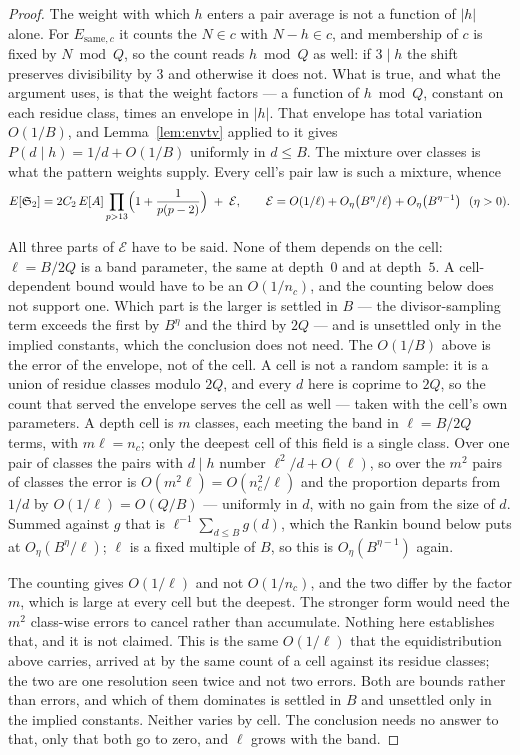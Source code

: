 \documentclass[11pt,a4paper]{article}
\theoremstyle{plain}
\theoremstyle{definition}
\theoremstyle{remark}
\renewcommand{\SS}{\mathfrak{S}}
\begin{document}
\begin{proof}
The weight with which $h$ enters a pair average is not a function of
$|h|$ alone. For $E_{\mathrm{same},c}$ it counts the $N\in c$ with
$N-h\in c$, and membership of $c$ is fixed by $N\bmod Q$, so the count
reads $h\bmod Q$ as well: if $3\mid h$ the shift preserves divisibility
by $3$ and otherwise it does not. What is true, and what the argument
uses, is that the weight factors --- a function of $h\bmod Q$, constant
on each residue class, times an envelope in $|h|$. That envelope has
total variation $O(1/B)$, and Lemma~\ref{lem:envtv} applied to it gives
$P(d\mid h)=1/d+O(1/B)$ uniformly in $d\le B$. The mixture over
classes is what the pattern weights supply. Every cell's pair law is such a
mixture, whence
\[
  E[\SS_2]=2C_2\,E[A]\prod_{p>13}\Bigl(1+\frac1{p(p-2)}\Bigr)
  \;+\;\mathcal E,
  \qquad
  \mathcal E=O(1/\ell)+O_\eta\bigl(B^{\eta}/\ell\bigr)
    +O_\eta\bigl(B^{\eta-1}\bigr)\ \ (\eta>0).
\]

All three parts of $\mathcal E$ have to be said. None of them depends
on the cell: $\ell=B/2Q$ is a band parameter, the same at depth~$0$ and
at depth~$5$. A cell-dependent bound would have to be an $O(1/n_c)$,
and the counting below does not support one.
Which part is the larger is settled in $B$ --- the divisor-sampling
term exceeds the first by $B^{\eta}$ and the third by $2Q$ --- and is
unsettled only in the implied constants, which the conclusion does not
need. The $O(1/B)$ above is the error of the
envelope, not of the cell. A cell is not a random sample: it is a
union of residue classes modulo $2Q$, and every $d$ here is coprime to
$2Q$, so the count that served the envelope serves the cell as well ---
taken with the cell's own parameters. A depth cell is $m$ classes, each
meeting the band in $\ell=B/2Q$ terms, with $m\ell=n_c$; only the
deepest cell of this field is a single class. Over one pair of classes
the pairs with $d\mid h$ number $\ell^2/d+O(\ell)$, so over the $m^2$
pairs of classes the error is $O(m^2\ell)=O(n_c^2/\ell)$ and the
proportion departs from $1/d$ by $O(1/\ell)=O(Q/B)$ --- uniformly in
$d$, with no gain from the size of $d$. Summed against $g$ that is
$\ell^{-1}\sum_{d\le B}g(d)$, which the Rankin bound below puts at
$O_\eta(B^{\eta}/\ell)$; $\ell$ is a fixed multiple of $B$, so this is
$O_\eta(B^{\eta-1})$ again.

The counting gives $O(1/\ell)$ and not $O(1/n_c)$, and the two differ
by the factor $m$, which is large at every cell but the deepest. The
stronger form would need the $m^2$ class-wise errors to cancel rather
than accumulate. Nothing here establishes that, and it is not claimed. This is the
same $O(1/\ell)$ that the equidistribution above carries, arrived at by
the same count of a cell against its residue classes; the two are one
resolution seen twice and not two errors. Both are bounds rather than
errors, and which of them dominates is settled in $B$ and unsettled
only in the implied constants. Neither varies by cell. The conclusion
needs no answer to that, only that both go to zero, and $\ell$ grows
with the band.


\end{proof}
\end{document}

